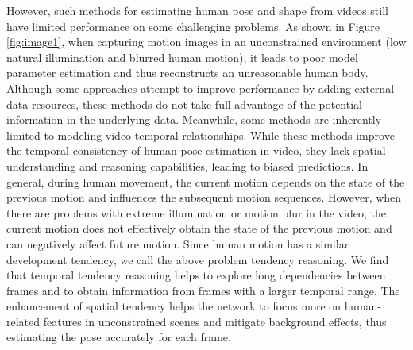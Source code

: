 \documentclass{bmvc2k}
\begin{document}
However, such methods for estimating human pose and shape from videos still have limited performance on some challenging problems. As shown in Figure \ref{fig:image1}, when capturing motion images in an unconstrained environment (low natural illumination and blurred human motion), it leads to poor model parameter estimation and thus reconstructs an unreasonable human body. Although some approaches \cite{Joo2021ExemplarFF, Sengupta2020SyntheticTF, kocabas2020vibe} attempt to improve performance by adding external data resources, these methods do not take full advantage of the potential information in the underlying data. Meanwhile, some methods \cite{choi2021beyond, luo20203d} are inherently limited to modeling video temporal relationships. While these methods improve the temporal consistency of human pose estimation in video, they lack spatial understanding and reasoning capabilities, leading to biased predictions.
In general, during human movement, the current motion depends on the state of the previous motion and influences the subsequent motion sequences. However, when there are problems with extreme illumination or motion blur in the video, the current motion does not effectively obtain the state of the previous motion and can negatively affect future motion. Since human motion has a similar development tendency, we call the above problem tendency reasoning. We find that temporal tendency reasoning helps to explore long dependencies between frames and to obtain information from frames with a larger temporal range. The enhancement of spatial tendency helps the network to focus more on human-related features in unconstrained scenes and mitigate background effects, thus estimating the pose accurately for each frame.
\end{document}
